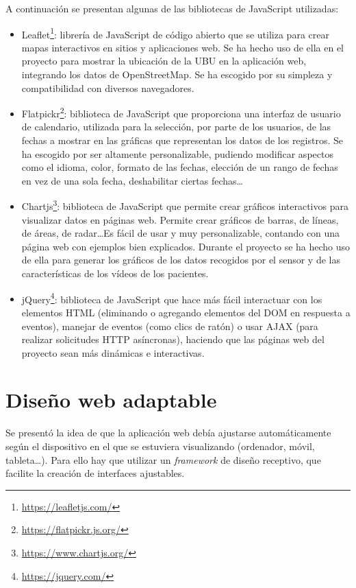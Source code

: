 A continuación se presentan algunas de las bibliotecas de JavaScript utilizadas:
\begin{itemize}
    \item Leaflet\footnote{\url{https://leafletjs.com/}}: librería de JavaScript de código abierto que se utiliza para crear mapas interactivos en sitios y aplicaciones web. Se ha hecho uso de ella en el proyecto para mostrar la ubicación de la UBU en la aplicación web, integrando los datos de OpenStreetMap. Se ha escogido por su simpleza y compatibilidad con diversos navegadores.
    
    \item Flatpickr\footnote{\url{https://flatpickr.js.org/}}: biblioteca de JavaScript que proporciona una interfaz de usuario de calendario, utilizada para la selección, por parte de los usuarios, de las fechas a mostrar en las gráficas que representan los datos de los registros. Se ha escogido por ser altamente personalizable, pudiendo modificar aspectos como el idioma, color, formato de las fechas, elección de un rango de fechas en vez de una sola fecha, deshabilitar ciertas fechas\ldots

    \item Chartjs\footnote{\url{https://www.chartjs.org/}}: biblioteca de JavaScript que permite crear gráficos interactivos para visualizar datos en páginas web. Permite crear gráficos de barras, de líneas, de áreas, de radar\ldots Es fácil de usar y muy personalizable, contando con una página web con ejemplos bien explicados. Durante el proyecto se ha hecho uso de ella para generar los gráficos de los datos recogidos por el sensor y de las características de los vídeos de los pacientes.

    \item jQuery\footnote{\url{https://jquery.com/}}: biblioteca de JavaScript que hace más fácil interactuar con los elementos HTML (eliminando o agregando elementos del DOM en respuesta a eventos), manejar de eventos (como clics de ratón) o usar AJAX (para realizar solicitudes HTTP asíncronas), haciendo que las páginas web del proyecto sean más dinámicas e interactivas.
\end{itemize}




\section{Diseño web adaptable}
Se presentó la idea de que la aplicación web debía ajustarse automáticamente según el dispositivo en el que se estuviera visualizando (ordenador, móvil, tableta\ldots). Para ello hay que utilizar un \textit{framework} de diseño receptivo, que facilite la creación de interfaces ajustables.

